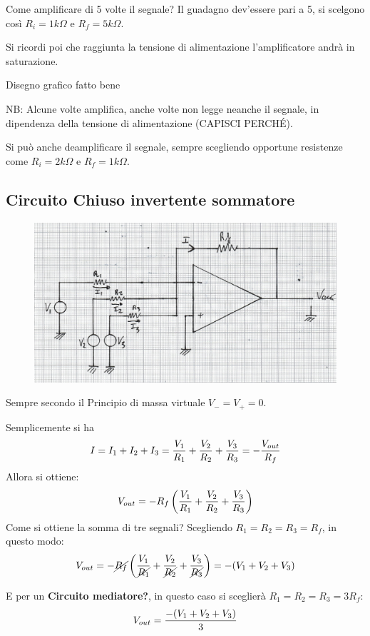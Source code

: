 \documentclass[a4paper, 15pt]{article}
\begin{document}
\begin{adjustwidth}{2in}{}
   		Come amplificare di 5 volte il segnale? Il guadagno dev'essere pari a 5, si scelgono così $R_i = 1k\Omega$ e $R_f = 5k\Omega$.
   		
   		Si ricordi poi che raggiunta la tensione di alimentazione l'amplificatore andrà in saturazione.
   		
   		Disegno grafico fatto bene 
   		
   		NB: Alcune volte amplifica, anche volte non legge neanche il segnale, in dipendenza della tensione di alimentazione (CAPISCI PERCHÉ). 
   		
   		Si può anche deamplificare il segnale, sempre scegliendo opportune resistenze come $R_i = 2k\Omega$ e $R_f = 1k\Omega$.\newline 
\end{adjustwidth}
\newpage
\subsection{Circuito Chiuso invertente sommatore}
\begin{adjustwidth}{2in}{}   	
\begin{figure}[H]
	\centering
	\includegraphics[width=0.5\linewidth]{immagini/mm(6)}
	\label{fig:mm6}
\end{figure}   		
   		Sempre secondo il Principio di massa virtuale \(V_- = V_+ = 0\). 
   		
   		Semplicemente si ha
   		\[I = I_1 + I_2 + I_3 = {V_1\over R_1} + {V_2\over R_2} + {V_3\over R_3} = -{V_{out}\over R_f} \]
   		Allora si ottiene:
   		\[ V_{out} = -R_f\left({V_1\over R_1} + {V_2\over R_2} + {V_3\over R_3}\right) \]
   		Come si ottiene la somma di tre segnali? Scegliendo $R_1 = R_2 = R_3 = R_f$, in questo modo: 
   		\[ V_{out} = -\cancel{R_f}\left({V_1\over \cancel{R_1}} + {V_2\over \cancel{R_2}} + {V_3\over \cancel{R_3}}\right) = -(V_1 + V_2 + V_3) \]
   		
   		E per un \textbf{Circuito mediatore?}, in questo caso si sceglierà $R_1 = R_2 = R_3 = 3R_f$:
   		\[ V_{out} = {-(V_1 + V_2 + V_3)\over3} \]
\end{adjustwidth}
\newpage
\end{document}
